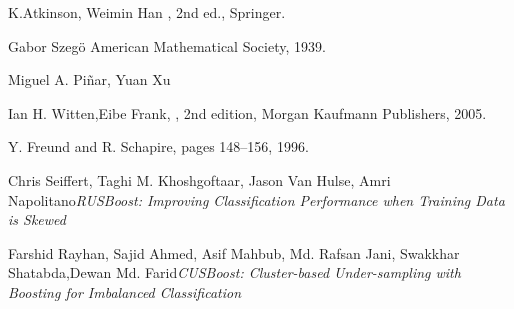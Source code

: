 \begin{thebibliography}{100}

K.Atkinson, Weimin Han
, 2nd ed.,
\newblock Springer.

Gabor Szegö
\newblock American Mathematical Society, 1939.

Miguel A. Piñar, Yuan Xu

Ian H. Witten,Eibe Frank, , 2nd edition,
\newblock Morgan Kaufmann Publishers, 2005.

Y. Freund and R. Schapire, 
\newblock pages 148–156, 1996.

\newblock Chris Seiffert, Taghi M. Khoshgoftaar, Jason Van Hulse, Amri Napolitano{\it RUSBoost: Improving Classification Performance when Training Data is Skewed}

\newblock Farshid Rayhan, Sajid Ahmed, Asif Mahbub, Md. Rafsan Jani,
Swakkhar Shatabda,Dewan Md. Farid{\it CUSBoost: Cluster-based Under-sampling with Boosting for Imbalanced Classification}

\end{thebibliography}
